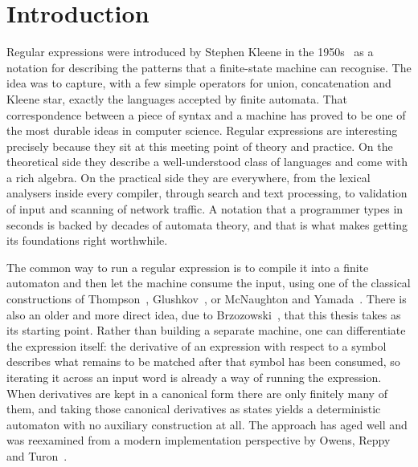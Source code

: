 \section{Introduction}\label{sec:introduction}

Regular expressions were introduced by Stephen Kleene in the 1950s~\cite{Kleene1956}
as a notation for describing the patterns that a finite-state machine can recognise. The idea was to
capture, with a few simple operators for union, concatenation and Kleene star,
exactly the languages accepted by finite automata. That correspondence between a 
piece of syntax and a machine has proved to be one of the most durable ideas
in computer science. Regular expressions are interesting precisely because they sit
at this meeting point of theory and practice. On the theoretical side they describe a
well-understood class of languages and come with a rich algebra. On the practical
side they are
everywhere, from the lexical analysers inside every compiler, through search and
text processing, to validation of input and scanning of network traffic. A notation
that a programmer types in seconds is backed by decades of automata theory, and that
is what makes getting its foundations right worthwhile.

The common way to run a regular expression is to compile it into a finite automaton
and then let the machine consume the input, using one of the classical
constructions of Thompson~\cite{Thompson1968}, Glushkov~\cite{Glushkov1962}, or
McNaughton and Yamada~\cite{McNaughtonYamada1960}. There is also an older and more
direct idea, due to Brzozowski~\cite{B64}, that this thesis takes as its starting
point. Rather than building a separate machine, one can differentiate the expression
itself: the derivative of an expression with respect to a symbol describes what
remains to be matched after that symbol has been consumed, so iterating it across an
input word is already a way of running the expression. When derivatives are kept in
a canonical form there are only finitely many of them, and taking those canonical
derivatives as states yields a deterministic automaton with no auxiliary
construction at all. The approach has aged well and was reexamined from a modern
implementation perspective by Owens, Reppy and Turon~\cite{OwensReppyTuron}.

